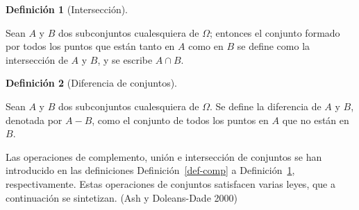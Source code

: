 \documentclass[
  us-letterpaper,
]{scrreprt}
\theoremstyle{plain}
\theoremstyle{definition}
\newtheorem{definition}{Definición}[chapter]
\theoremstyle{definition}
\theoremstyle{plain}
\theoremstyle{remark}
\begin{document}
\begin{definition}[Intersección]\protect\hypertarget{def-inter}{}\label{def-inter}

Sean \(A\) y \(B\) dos subconjuntos cualesquiera de \(\Omega\); entonces
el conjunto formado por todos los puntos que están tanto en \(A\) como
en \(B\) se define como la intersección de \(A\) y \(B\), y se escribe
\(A \cap B\).

\end{definition}

\begin{definition}[Diferencia de
conjuntos]\protect\hypertarget{def-dfc}{}\label{def-dfc}

Sean \(A\) y \(B\) dos subconjuntos cualesquiera de \(\Omega\). Se
define la diferencia de \(A\) y \(B\), denotada por \(A-B\), como el
conjunto de todos los puntos en \(A\) que no están en \(B\).

\end{definition}

Las operaciones de complemento, unión e intersección de conjuntos se han
introducido en las definiciones Definición~\ref{def-comp} a
Definición~\ref{def-inter}, respectivamente. Estas operaciones de
conjuntos satisfacen varias leyes, que a continuación se sintetizan.
(Ash y Doleans-Dade 2000)
\end{document}
